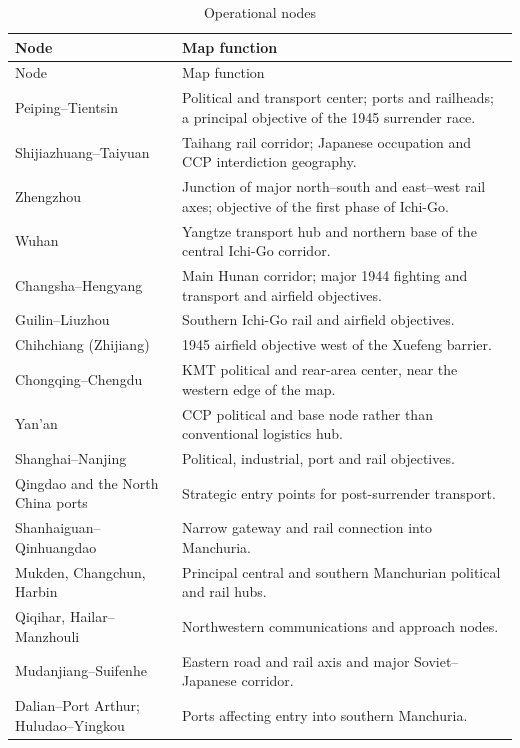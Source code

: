 \documentclass[11pt]{article}
\begin{document}
\begin{longtable}{p{}p{}}
\caption{Operational nodes}\label{tab:nodes}\\
\toprule Node & Map function \\\midrule\endfirsthead
\toprule Node & Map function \\\midrule\endhead
\bottomrule\endfoot
Peiping--Tientsin & Political and transport center; ports and railheads; a principal objective of the 1945 surrender race.\\
Shijiazhuang--Taiyuan & Taihang rail corridor; Japanese occupation and CCP interdiction geography.\\
Zhengzhou & Junction of major north--south and east--west rail axes; objective of the first phase of Ichi-Go.\\
Wuhan & Yangtze transport hub and northern base of the central Ichi-Go corridor.\\
Changsha--Hengyang & Main Hunan corridor; major 1944 fighting and transport and airfield objectives.\\
Guilin--Liuzhou & Southern Ichi-Go rail and airfield objectives.\\
Chihchiang (Zhijiang) & 1945 airfield objective west of the Xuefeng barrier.\\
Chongqing--Chengdu & KMT political and rear-area center, near the western edge of the map.\\
Yan'an & CCP political and base node rather than conventional logistics hub.\\
Shanghai--Nanjing & Political, industrial, port and rail objectives.\\
Qingdao and the North China ports & Strategic entry points for post-surrender transport.\\
Shanhaiguan--Qinhuangdao & Narrow gateway and rail connection into Manchuria.\\
Mukden, Changchun, Harbin & Principal central and southern Manchurian political and rail hubs.\\
Qiqihar, Hailar--Manzhouli & Northwestern communications and approach nodes.\\
Mudanjiang--Suifenhe & Eastern road and rail axis and major Soviet--Japanese corridor.\\
Dalian--Port Arthur; Huludao--Yingkou & Ports affecting entry into southern Manchuria.\\
\end{longtable}
\end{document}

